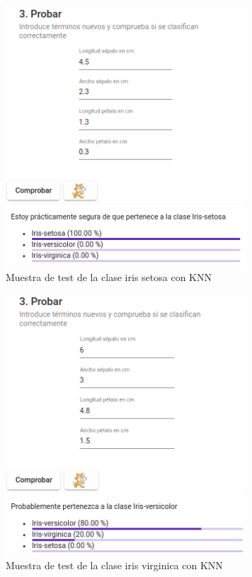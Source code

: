 \documentclass[a4paper, 12pt]{book}
\begin{document}
\begin{figure}
	\centering
	\includegraphics[width=9cm, keepaspectratio]{img/iris_set_num_knn.png}
	\caption{Muestra de test de la clase iris setosa con KNN} 	\label{fig:ejemplo13}
\end{figure}

\begin{figure}
	\centering
	\includegraphics[width=9cm, keepaspectratio]{img/iris_vir_num_knn.png}
	\caption{Muestra de test de la clase iris virginica con KNN} 	\label{fig:ejemplo14}
\end{figure}
\end{document}
